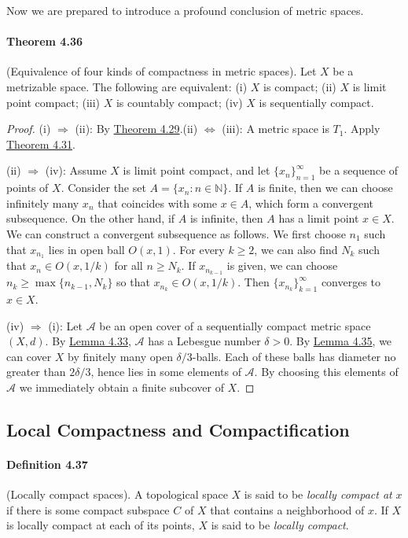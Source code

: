 \documentclass{article}
\numberwithin{equation}{section}
\theoremstyle{plain}
\theoremstyle{definition}
\begin{document}
Now we are prepared to introduce a profound conclusion of metric spaces.

\paragraph{Theorem 4.36\label{thm:4.36}} (Equivalence of four kinds of compactness in metric spaces). Let $X$ be a metrizable space. The following are equivalent: (i) $X$ is compact; (ii) $X$ is limit point compact; (iii) $X$ is countably compact; (iv) $X$ is sequentially compact.
\begin{proof}
(i) $\Rightarrow$ (ii): By \hyperref[thm:4.29]{Theorem 4.29}.\quad (ii) $\Leftrightarrow$ (iii): A metric space is $T_1$. Apply \hyperref[thm:4.31]{Theorem 4.31}.

(ii) $\Rightarrow$ (iv): Assume $X$ is limit point compact, and let $\{x_n\}_{n=1}^\infty$ be a sequence of points of $X$. Consider the set $A=\{x_n:n\in\mathbb{N}\}$. If $A$ is finite, then we can choose infinitely many $x_n$ that coincides with some $x\in A$, which form a convergent subsequence. On the other hand, if $A$ is infinite, then $A$ has a limit point $x\in X$. We can construct a convergent subsequence as follows. We first choose $n_1$ such that $x_{n_1}$ lies in open ball $O(x,1)$. For every $k\geq 2$, we can also find $N_k$ such that $x_n\in O(x,1/k)$ for all $n\geq N_k$. If $x_{n_{k-1}}$ is given, we can choose $n_k\geq\max\{n_{k-1},N_k\}$ so that $x_{n_k}\in O(x,1/k)$. Then $\{x_{n_k}\}_{k=1}^\infty$ converges to $x\in X$.

(iv) $\Rightarrow$ (i): Let $\mathscr{A}$ be an open cover of a sequentially compact metric space $(X,d)$. By \hyperref[lemma:4.33]{Lemma 4.33}, $\mathscr{A}$ has a Lebesgue number $\delta >0$. By \hyperref[lemma:4.35]{Lemma 4.35}, we can cover $X$ by finitely many open $\delta/3$-balls. Each of these balls has diameter no greater than $2\delta/3$, hence lies in some elements of $\mathscr{A}$. By choosing this elements of $\mathscr{A}$ we immediately obtain a finite subcover of $X$.
\end{proof}

\subsection{Local Compactness and Compactification}
\paragraph{Definition 4.37\label{def:4.37}} (Locally compact spaces). A topological space $X$ is said to be \textit{locally compact at} $x$ if there is some compact subspace $C$ of $X$ that contains a neighborhood of $x$. If $X$ is locally compact at each of its points, $X$ is said to be \textit{locally compact}.
\end{document}
